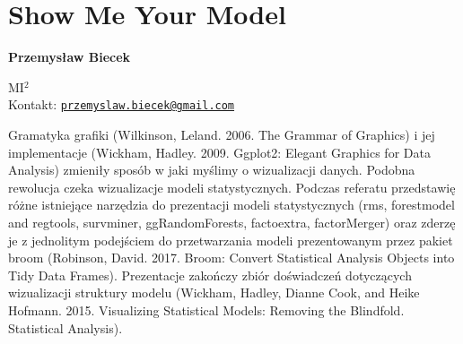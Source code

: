 \documentclass[\main/boa.tex]{subfiles}
\begin{document}
\section{Show Me Your Model}


\begin{minipage}{0.915\textwidth}
	\centering
  {\bf \huge {} Przemysław Biecek}
\end{minipage}


\vskip 0.3cm

\begin{affiliations}
\begin{minipage}{0.915\textwidth}
\centering
\large MI$^{2}$  \\[5pt]
Kontakt: \href{mailto:przemyslaw.biecek@gmail.com}{\nolinkurl{przemyslaw.biecek@gmail.com}}\\
\end{minipage}
\end{affiliations}

\vskip 0.8cm

Gramatyka grafiki (Wilkinson, Leland. 2006. The Grammar of Graphics) i jej implementacje (Wickham, Hadley. 2009. Ggplot2: Elegant Graphics for Data Analysis) zmieniły sposób w jaki myślimy o wizualizacji danych. Podobna rewolucja czeka wizualizacje modeli statystycznych. Podczas referatu przedstawię różne istniejące narzędzia do prezentacji modeli statystycznych (rms, forestmodel and regtools, survminer, ggRandomForests, factoextra, factorMerger) oraz zderzę je z jednolitym podejściem do przetwarzania modeli prezentowanym przez pakiet broom (Robinson, David. 2017. Broom: Convert Statistical Analysis Objects into Tidy Data Frames). Prezentacje zakończy zbiór doświadczeń dotyczących wizualizacji struktury modelu (Wickham, Hadley, Dianne Cook, and Heike Hofmann. 2015. Visualizing Statistical Models: Removing the Blindfold. Statistical Analysis). 
\end{document}
